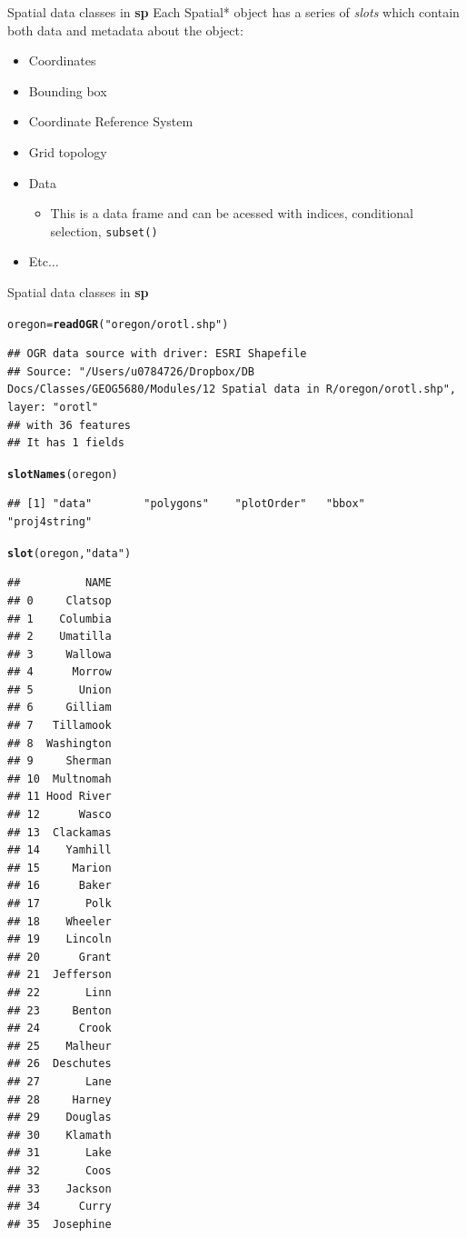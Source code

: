 \documentclass[aspectratio=169]{beamer}\usepackage[]{graphicx}\usepackage[]{color}
\makeatletter
\newcommand{\hlstr}[1]{\textcolor[rgb]{0.192,0.494,0.8}{#1}}%
\newcommand{\hlstd}[1]{\textcolor[rgb]{0.345,0.345,0.345}{#1}}%
\newcommand{\hlkwb}[1]{\textcolor[rgb]{0.69,0.353,0.396}{#1}}%
\newcommand{\hlkwd}[1]{\textcolor[rgb]{0.737,0.353,0.396}{\textbf{#1}}}%
\newenvironment{kframe}{%
 \def\at@end@of@kframe{}%
 \ifinner\ifhmode%
  \def\at@end@of@kframe{\end{minipage}}%
  \begin{minipage}{\columnwidth}%
 \fi\fi%
 \def\FrameCommand##1{\hskip\@totalleftmargin \hskip-\fboxsep
 \colorbox{shadecolor}{##1}\hskip-\fboxsep
     \hskip-\linewidth \hskip-\@totalleftmargin \hskip\columnwidth}%
 \MakeFramed {\advance\hsize-\width
   \@totalleftmargin\z@ \linewidth\hsize
   \@setminipage}}%
 {\par\unskip\endMakeFramed%
 \at@end@of@kframe}
\newenvironment{knitrout}{}{} %
\makeatother
\begin{document}
\begin{frame}{Spatial data classes in \textbf{sp}}
Each Spatial* object has a series of \emph{slots} which contain both data and metadata about the object:
\begin{itemize}
	\item Coordinates
	\item Bounding box
	\item Coordinate Reference System
	\item Grid topology
	\item Data
	  \begin{itemize}
	    \item This is a data frame and can be acessed with indices, conditional selection, \texttt{subset()}
	  \end{itemize}
	\item Etc$\ldots$
\end{itemize}
\end{frame}

\begin{frame}[fragile]{Spatial data classes in \textbf{sp}}
\begin{knitrout}\scriptsize
{}\color{fgcolor}\begin{kframe}
\begin{alltt}
\hlstd{oregon} \hlkwb{=} \hlkwd{readOGR}\hlstd{(}\hlstr{"oregon/orotl.shp"}\hlstd{)}
\end{alltt}
\begin{verbatim}
## OGR data source with driver: ESRI Shapefile 
## Source: "/Users/u0784726/Dropbox/DB Docs/Classes/GEOG5680/Modules/12 Spatial data in R/oregon/orotl.shp", layer: "orotl"
## with 36 features
## It has 1 fields
\end{verbatim}
\begin{alltt}
\hlkwd{slotNames}\hlstd{(oregon)}
\end{alltt}
\begin{verbatim}
## [1] "data"        "polygons"    "plotOrder"   "bbox"        "proj4string"
\end{verbatim}
\begin{alltt}
\hlkwd{slot}\hlstd{(oregon,}\hlstr{"data"}\hlstd{)}
\end{alltt}
\begin{verbatim}
##          NAME
## 0     Clatsop
## 1    Columbia
## 2    Umatilla
## 3     Wallowa
## 4      Morrow
## 5       Union
## 6     Gilliam
## 7   Tillamook
## 8  Washington
## 9     Sherman
## 10  Multnomah
## 11 Hood River
## 12      Wasco
## 13  Clackamas
## 14    Yamhill
## 15     Marion
## 16      Baker
## 17       Polk
## 18    Wheeler
## 19    Lincoln
## 20      Grant
## 21  Jefferson
## 22       Linn
## 23     Benton
## 24      Crook
## 25    Malheur
## 26  Deschutes
## 27       Lane
## 28     Harney
## 29    Douglas
## 30    Klamath
## 31       Lake
## 32       Coos
## 33    Jackson
## 34      Curry
## 35  Josephine
\end{verbatim}
\end{kframe}
\end{knitrout}
\end{frame}
\end{document}
